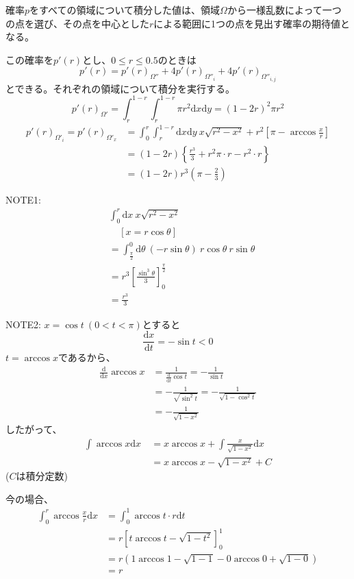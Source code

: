 確率$p$をすべての領域について積分した値は、領域$\Omega$から一様乱数によって一つの点を選び、その点を中心とした$r$による範囲に1つの点を見出す確率の期待値となる。

この確率を$p'(r)$とし、$0\le r \le 0.5$のときは
$$p'(r) = p'(r)_{\Omega''} + 4p'(r)_{\Omega''_{i}} + 4p'(r)_{\Omega''_{i,j}}$$
とできる。それぞれの領域について積分を実行する。
$$p'(r)_{\Omega'} = \int_{r}^{1-r} \int_{r}^{1-r}\pi r^{2}\mathrm{d}x\mathrm{d}y = (1-2r)^{2}\pi r^{2}$$
\begin{align}
p'(r)_{\Omega'_{i}} = p'(r)_{\Omega'_{x}} &= \int_{0}^{r} \int_{r}^{1-r}\mathrm{d}x\mathrm{d}y\ x\sqrt{r^{2}-x^{2}} + r^{2}\left[\pi - \arccos\frac{x}{r}\right]\nonumber \\
&= (1-2r)\left\{ \frac{r^{3}}{3} + r^{2}\pi\cdot r - r^{2}\cdot r \right\}\nonumber \\
&= (1-2r)r^{3}\left( \pi-\frac{2}{3} \right)
\end{align}

NOTE1:
\begin{align}
&\int_{0}^{r}\mathrm{d}x\ x\sqrt{r^{2}-x^{2}} \nonumber \\
&\ \ \ \ \ \left[x = r\cos \theta \right]\nonumber \\
&= \int_{\frac{\pi}{2}}^{0}\mathrm{d}\theta\ (-r\sin\theta)\ r\cos\theta\ r\sin\theta\nonumber \\
&= r^{3}\left[ \frac{\sin^{3}\theta}{3}\right]^{\frac{\pi}{2}}_{0} \nonumber \\
&= \frac{r^{3}}{3}
\end{align}

NOTE2:
$x = \cos t \ (0< t< \pi)$とすると
$$\frac{\mathrm{d}x}{\mathrm{d}t} = - \sin t < 0$$
$t = \arccos x$であるから、
\begin{align}
\frac{\mathrm{d}}{\mathrm{d}x}\arccos x &= \frac{1}{\frac{\mathrm{d}}{\mathrm{d}t}\cos t} = -\frac{1}{\sin t}\nonumber \\
&=- \frac{1}{\sqrt{\sin^{2}t}} = - \frac{1}{\sqrt{1- \cos^{2}t}} \nonumber \\
&= - \frac{1}{\sqrt{1- x^{2}}}
\end{align}
したがって、
\begin{align}
\int \arccos x \mathrm{d}x\  &= x\arccos x + \int \frac{x}{\sqrt{1-x^{2}}}\mathrm{d}x\nonumber \\
&=x\arccos x - \sqrt{1-x^{2}} + C
\end{align}
($C$は積分定数)

今の場合、
\begin{align}
\int^{r}_{0} \arccos \frac{x}{r} \mathrm{d}x &= \int^{1}_{0}\arccos t \cdot r\mathrm{d}t\nonumber \\
&= r \left[ t \arccos t - \sqrt{1-t^{2}} \right]^{1}_{0}\nonumber \\
&= r ( 1\arccos1 -\sqrt{1-1} - 0 \arccos0 + \sqrt{1-0})\nonumber \\
&= r
\end{align}

